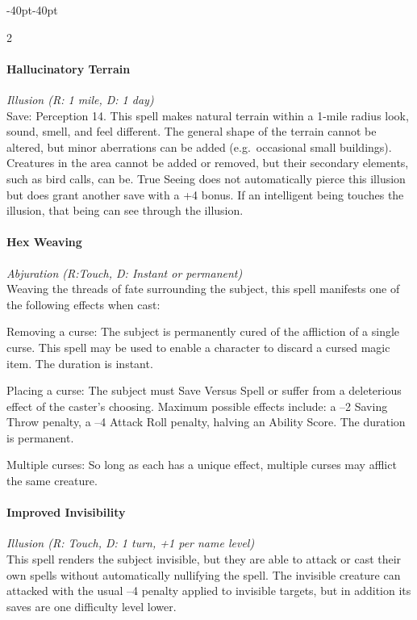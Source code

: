 \documentclass{book}
\begin{document}
\begin{adjustwidth}{-40pt}{-40pt}
\begin{multicols}{2}
\paragraph{Hallucinatory Terrain}\label{hallucinatory-terrain}

\emph{Illusion (R: 1 mile, D: 1 day)}\\
Save: Perception 14. This spell makes natural terrain within a 1-mile
radius look, sound, smell, and feel different. The general shape of the
terrain cannot be altered, but minor aberrations can be added
(e.g.~occasional small buildings). Creatures in the area cannot be added
or removed, but their secondary elements, such as bird calls, can be.
True Seeing does not automatically pierce this illusion but does grant
another save with a +4 bonus. If an intelligent being touches the
illusion, that being can see through the illusion.

\paragraph{Hex Weaving}\label{hex-weaving}

\emph{Abjuration (R:Touch, D: Instant or permanent)}\\
Weaving the threads of fate surrounding the subject, this spell
manifests one of the following effects when cast:

Removing a curse: The subject is permanently cured of the affliction of
a single curse. This spell may be used to enable a character to discard
a cursed magic item. The duration is instant.

Placing a curse: The subject must Save Versus Spell or suffer from a
deleterious effect of the caster's choosing. Maximum possible effects
include: a --2 Saving Throw penalty, a --4 Attack Roll penalty, halving
an Ability Score. The duration is permanent.

Multiple curses: So long as each has a unique effect, multiple curses
may afflict the same creature.

\paragraph{Improved Invisibility}\label{improved-invisibility}

\emph{Illusion (R: Touch, D: 1 turn, +1 per name level)}\\
This spell renders the subject invisible, but they are able to attack or
cast their own spells without automatically nullifying the spell. The
invisible creature can attacked with the usual --4 penalty applied to
invisible targets, but in addition its saves are one difficulty level
lower.


\end{multicols}
\end{adjustwidth}
\end{document}
